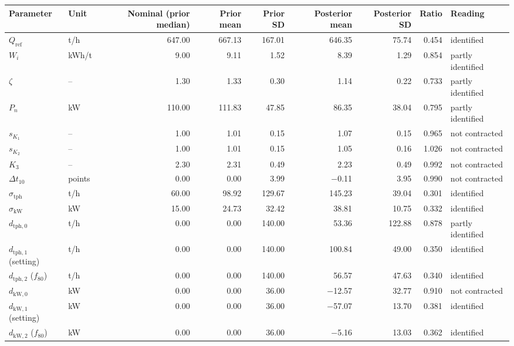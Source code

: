 \begin{tabular}{@{}llrrrrrrl@{}}
\toprule
Parameter & Unit & Nominal (prior median) & Prior mean & Prior SD & Posterior mean & Posterior SD & Ratio & Reading \\
\midrule
$Q_{\mathrm{ref}}$ & t/h & 647.00 & 667.13 & 167.01 & 646.35 & 75.74 & 0.454 & identified \\
$W_i$ & kWh/t & 9.00 & 9.11 & 1.52 & 8.39 & 1.29 & 0.854 & partly identified \\
$\zeta$ & -- & 1.30 & 1.33 & 0.30 & 1.14 & 0.22 & 0.733 & partly identified \\
$P_n$ & kW & 110.00 & 111.83 & 47.85 & 86.35 & 38.04 & 0.795 & partly identified \\
$s_{K_1}$ & -- & 1.00 & 1.01 & 0.15 & 1.07 & 0.15 & 0.965 & not contracted \\
$s_{K_2}$ & -- & 1.00 & 1.01 & 0.15 & 1.05 & 0.16 & 1.026 & not contracted \\
$K_3$ & -- & 2.30 & 2.31 & 0.49 & 2.23 & 0.49 & 0.992 & not contracted \\
$\Delta t_{10}$ & points & 0.00 & 0.00 & 3.99 & $-$0.11 & 3.95 & 0.990 & not contracted \\
\midrule
$\sigma_{\mathrm{tph}}$ & t/h & 60.00 & 98.92 & 129.67 & 145.23 & 39.04 & 0.301 & identified \\
$\sigma_{\mathrm{kW}}$ & kW & 15.00 & 24.73 & 32.42 & 38.81 & 10.75 & 0.332 & identified \\
\midrule
$d_{\mathrm{tph},0}$ & t/h & 0.00 & 0.00 & 140.00 & 53.36 & 122.88 & 0.878 & partly identified \\
$d_{\mathrm{tph},1}$ (setting) & t/h & 0.00 & 0.00 & 140.00 & 100.84 & 49.00 & 0.350 & identified \\
$d_{\mathrm{tph},2}$ ($f_{80}$) & t/h & 0.00 & 0.00 & 140.00 & 56.57 & 47.63 & 0.340 & identified \\
\midrule
$d_{\mathrm{kW},0}$ & kW & 0.00 & 0.00 & 36.00 & $-$12.57 & 32.77 & 0.910 & not contracted \\
$d_{\mathrm{kW},1}$ (setting) & kW & 0.00 & 0.00 & 36.00 & $-$57.07 & 13.70 & 0.381 & identified \\
$d_{\mathrm{kW},2}$ ($f_{80}$) & kW & 0.00 & 0.00 & 36.00 & $-$5.16 & 13.03 & 0.362 & identified \\
\bottomrule
\end{tabular}
